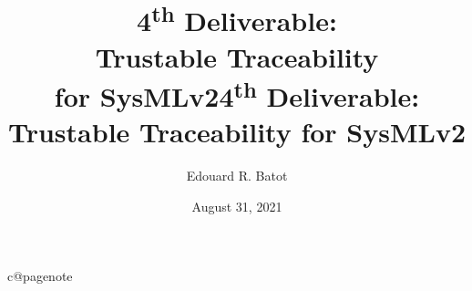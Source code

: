 \documentclass[12pt,twoside]{report}
\title{4\textsuperscript{th} Deliverable:\\Trustable Traceability\\for SysMLv2}
\author{
  Edouard R. Batot 
}
\date{ 
  August 31, 2021
}
\begin{document}
\maketitle 

\title{4\textsuperscript{th} Deliverable: \textbf{Trustable Traceability for SysMLv2}}

\tableofcontents

\cleardoublepage
\renewcommand{\sectionbreak}{}

\vspace{33em}
\listoffigures
\lstlistoflistings
\renewcommand{\sectionbreak}{\cleardoublepage}
\cleardoublepage













%

%


\cleardoublepage





\makeatletter
\ifcsname c@pagenote\endcsname
{}
\fi
\makeatother

\end{document}
